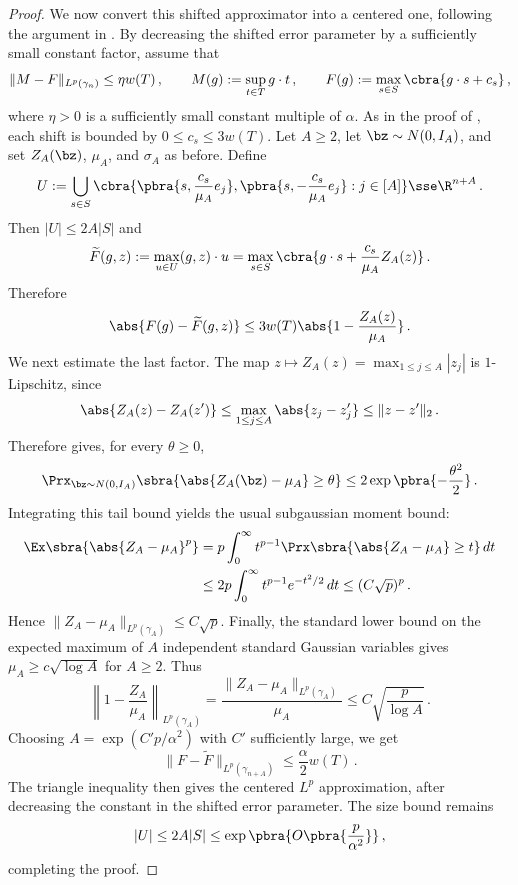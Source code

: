 \documentclass[11pt]{article}
\begin{document}
\begin{proof}
	We now convert this shifted approximator into a centered one, following the argument in . 
	By decreasing the shifted error parameter by a sufficiently small constant factor, assume that
	\[
		\|M-F\|_{L^p(\gamma_n)}
		\leq
		\eta w(T)\,,
		\qquad
		M(g):=\sup_{t\in T}g\cdot t\,,
		\qquad
		F(g):=\max_{s\in S}\cbra{g\cdot s+c_s}\,,
	\]
	where $\eta>0$ is a sufficiently small constant multiple of $\alpha$.
	As in the proof of , each shift is bounded by $0\leq c_s\leq 3w(T)$. 
	Let $A\geq2$, let $\bz\sim N(0,I_A)$, and set $Z_A(\bz)$, $\mu_A$, and $\sigma_A$ as before. 
	Define 
	\[
		U
		:=
		\bigcup_{s\in S}
		\cbra{
			\pbra{s,\frac{c_s}{\mu_A}e_j},
			\pbra{s,-\frac{c_s}{\mu_A}e_j}
			:
			j\in[A]
		}
		\sse\R^{n+A}\,.
	\]
	Then $|U|\leq2A|S|$ and
	\[
		\widetilde F(g,z):=\max_{u\in U}(g,z)\cdot u
		=
		\max_{s\in S}\cbra{
			g\cdot s+\frac{c_s}{\mu_A}Z_A(z)
		}\,. 
	\]
	Therefore
	\[
		\abs{F(g)-\widetilde F(g,z)}
		\leq
		3w(T)\abs{1-\frac{Z_A(z)}{\mu_A}}\,.
	\]
	We next estimate the last factor.
	The map $z\mapsto Z_A(z)=\max_{1\leq j\leq A}|z_j|$ is $1$-Lipschitz, since
	\[
		\abs{Z_A(z)-Z_A(z')}
		\leq
		\max_{1\leq j\leq A}\abs{z_j-z'_j}
		\leq
		\|z-z'\|_2\,.
	\]
	Therefore  gives, for every $\theta \geq0$,
	\[
		\Prx_{\bz\sim N(0,I_A)}
		\sbra{
			\abs{Z_A(\bz)-\mu_A}\geq \theta 
		}
		\leq
		2\exp\pbra{-\frac{\theta^2}{2}}\,.
	\]
	Integrating this tail bound yields the usual subgaussian moment bound: 
	\begin{align*}
		\Ex\sbra{\abs{Z_A-\mu_A}^p}
		&=
		p\int_0^\infty t^{p-1}
		\Prx\sbra{\abs{Z_A-\mu_A}\geq t}\,dt \\
		&\leq
		2p\int_0^\infty t^{p-1}e^{-t^2/2}\,dt
		\leq
		(C\sqrt p)^p\,.
	\end{align*}
	Hence $\|Z_A-\mu_A\|_{L^p(\gamma_A)} \leq C\sqrt p$. 
	Finally, the standard lower bound on the expected maximum of $A$ independent standard Gaussian variables gives $\mu_A\geq c\sqrt{\log A}$ for $A\geq2$.
	Thus
	\[
		\left\|1-\frac{Z_A}{\mu_A}\right\|_{L^p(\gamma_A)}
		=
		\frac{\|Z_A-\mu_A\|_{L^p(\gamma_A)}}{\mu_A}
		\leq
		C\sqrt{\frac{p}{\log A}}\,.
	\]
	Choosing $A = \exp(C'p/\alpha^2)$ with $C'$ sufficiently large, we get
	\[
		\|F-\widetilde F\|_{L^p(\gamma_{n+A})}
		\leq
		\frac{\alpha}{2}w(T)\,.
	\]
	The triangle inequality then gives the centered $L^p$ approximation, after decreasing the constant in the shifted error parameter.
	The size bound remains
	\[
		|U|
		\leq
		2A|S|
		\leq
		\exp\pbra{
			O\pbra{\frac{p}{\alpha^2}}
		}\,,
	\]
	completing the proof. 
\end{proof}
\end{document}
